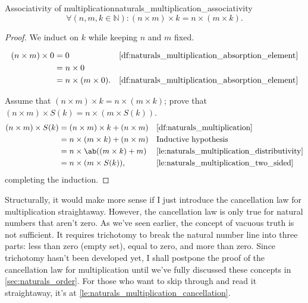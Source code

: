 \begin{lemma}{Associativity of multiplication}{naturals_multiplication_associativity}
  \begin{equation*}
    \forall (n, m, k \in \mathbb{N}) : (n \times m) \times k = n \times (m \times k).
  \end{equation*}
\end{lemma}
\begin{proof}
  We induct on \(k\) while keeping \(n\) and \(m\) fixed.

  \basecase
  \begin{align}
    (n \times m) \times 0 & = 0                      &  & \textrm{\Cref{df:naturals_multiplication_absorption_element}} \\
                          & = n \times 0                                                                                \\
                          & = n \times (m \times 0). &  & \textrm{\Cref{df:naturals_multiplication_absorption_element}}
  \end{align}

  \inductivestep Assume that \((n \times m) \times k = n \times (m \times k)\); prove that
  \((n \times m) \times S(k) = n \times (m \times S(k))\).
  \begin{align}
    (n \times m) \times S(k) & = (n \times m) \times k + (n \times m) &  & \textrm{\Cref{df:naturals_multiplication}}                \\
                             & = n \times (m \times k) + (n \times m) &  & \textrm{Inductive hypothesis}                             \\
                             & = n \times \ab((m \times k) + m)       &  & \textrm{\Cref{le:naturals_multiplication_distributivity}} \\
                             & = n \times (m \times S(k)),            &  & \textrm{\Cref{le:naturals_multiplication_two_sided}}
  \end{align}
  completing the induction.
\end{proof}

Structurally, it would make more sense if I just introduce the cancellation law for multiplication
straightaway. However, the cancellation law is only true for natural numbers that aren't zero. As
we've seen earlier, the concept of vacuous truth is not sufficient. It requires trichotomy to break
the natural number line into three parts: less than zero (empty set), equal to zero, and more than
zero. Since trichotomy hasn't been developed yet, I shall postpone the proof of the cancellation law
for multiplication until we've fully discussed these concepts in \cref{sec:naturals_order}. For
those who want to skip through and read it straightaway, it's at
\cref{le:naturals_multiplication_cancellation}.

